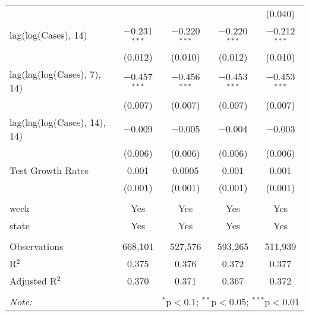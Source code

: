 \begin{tabular}{@{\extracolsep{1pt}}lcccc}
  &  &  &  & (0.040) \\ 
  lag(log(Cases), 14) & $-$0.231$^{***}$ & $-$0.220$^{***}$ & $-$0.220$^{***}$ & $-$0.212$^{***}$ \\ 
  & (0.012) & (0.010) & (0.012) & (0.010) \\ 
  lag(lag(log(Cases), 7), 14) & $-$0.457$^{***}$ & $-$0.456$^{***}$ & $-$0.453$^{***}$ & $-$0.453$^{***}$ \\ 
  & (0.007) & (0.007) & (0.007) & (0.007) \\ 
  lag(lag(log(Cases), 14), 14) & $-$0.009 & $-$0.005 & $-$0.004 & $-$0.003 \\ 
  & (0.006) & (0.006) & (0.006) & (0.006) \\ 
  Test Growth Rates & 0.001 & 0.0005 & 0.001 & 0.001 \\ 
  & (0.001) & (0.001) & (0.001) & (0.001) \\ 
 \hline \\[-1.8ex] 
week & Yes & Yes & Yes & Yes \\ 
state & Yes & Yes & Yes & Yes \\ 
\hline \\[-1.8ex] 
Observations & 668,101 & 527,576 & 593,265 & 511,939 \\ 
R$^{2}$ & 0.375 & 0.376 & 0.372 & 0.377 \\ 
Adjusted R$^{2}$ & 0.370 & 0.371 & 0.367 & 0.372 \\ 
\hline 
\hline \\[-1.8ex] 
\textit{Note:}  & \multicolumn{4}{r}{$^{*}$p$<$0.1; $^{**}$p$<$0.05; $^{***}$p$<$0.01} \\ 
\end{tabular} 
